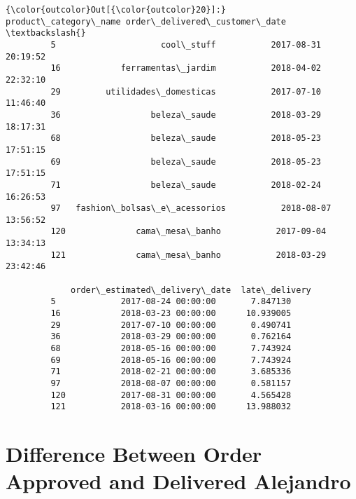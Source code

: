 \documentclass[11pt]{article}
\begin{document}
\begin{Verbatim}[commandchars=\\\{\}]
{\color{outcolor}Out[{\color{outcolor}20}]:}            product\_category\_name order\_delivered\_customer\_date  \textbackslash{}
         5                     cool\_stuff           2017-08-31 20:19:52   
         16            ferramentas\_jardim           2018-04-02 22:32:10   
         29         utilidades\_domesticas           2017-07-10 11:46:40   
         36                  beleza\_saude           2018-03-29 18:17:31   
         68                  beleza\_saude           2018-05-23 17:51:15   
         69                  beleza\_saude           2018-05-23 17:51:15   
         71                  beleza\_saude           2018-02-24 16:26:53   
         97   fashion\_bolsas\_e\_acessorios           2018-08-07 13:56:52   
         120              cama\_mesa\_banho           2017-09-04 13:34:13   
         121              cama\_mesa\_banho           2018-03-29 23:42:46   
         
             order\_estimated\_delivery\_date  late\_delivery  
         5             2017-08-24 00:00:00       7.847130  
         16            2018-03-23 00:00:00      10.939005  
         29            2017-07-10 00:00:00       0.490741  
         36            2018-03-29 00:00:00       0.762164  
         68            2018-05-16 00:00:00       7.743924  
         69            2018-05-16 00:00:00       7.743924  
         71            2018-02-21 00:00:00       3.685336  
         97            2018-08-07 00:00:00       0.581157  
         120           2017-08-31 00:00:00       4.565428  
         121           2018-03-16 00:00:00      13.988032  
\end{Verbatim}
            
    \hypertarget{difference-between-order-approved-and-delivered-alejandro}{%
\section{Difference Between Order Approved and Delivered
Alejandro}\label{difference-between-order-approved-and-delivered-alejandro}}
\end{document}
